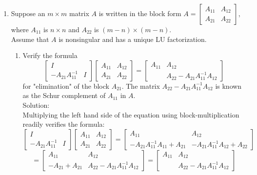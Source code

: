 \documentclass[12pt]{article}
\numberwithin{equation}{section}
\newcommand{\A}{\mathcal{A}}
\begin{document}
\begin{enumerate}
\item Suppose an $m\times m$ matrix $A$ is written in the block form  $A=\left[\begin{array}{cc}A_{11}&A_{12}\\A_{21}&A_{22}\end{array}\right]$, where $A_{11}$ is $n\times n$ and $A_{22}$ is $(m-n)\times(m-n).$\\
Assume that $A$ is nonsingular and has a unique LU factorization.\\
\begin{enumerate}
\item Verify the formula
$$\left[\begin{array}{cc}I& \\-A_{21}A_{11}^{-1}&I\end{array}\right]\left[\begin{array}{cc}A_{11}&A_{12}\\A_{21}&A_{22}\end{array}\right]=\left[\begin{array}{cc}A_{11}&A_{12}\\&A_{22}-A_{21}A_{11}^{-1}A_{12}\end{array}\right]$$
for "elimination" of the block $A_{21}$. The matrix $A_{22}-A_{21}A_{11}^{-1}A_{12}$ is known as the Schur complement of $A_{11}$ in $A$.\\

Solution:\\

Multiplying the left hand side of the equation using block-multiplication readily verifies the formula:
$$\left[\begin{array}{cc}I& \\-A_{21}A_{11}^{-1}&I\end{array}\right]\left[\begin{array}{cc}A_{11}&A_{12}\\A_{21}&A_{22}\end{array}\right]=\left[\begin{array}{cc}A_{11}&A_{12}\\-A_{21}A_{11}^{-1}A_{11}+A_{21}&-A_{21}A_{11}^{-1}A_{12}+A_{22}\end{array}\right]$$
$$=\left[\begin{array}{cc}A_{11}&A_{12}\\-A_{21}+A_{21}&A_{22}-A_{21}A_{11}^{-1}A_{12}\end{array}\right]=\left[\begin{array}{cc}A_{11}&A_{12}\\&A_{22}-A_{21}A_{11}^{-1}A_{12}\end{array}\right]$$


\end{enumerate}
\end{enumerate}
\end{document}
